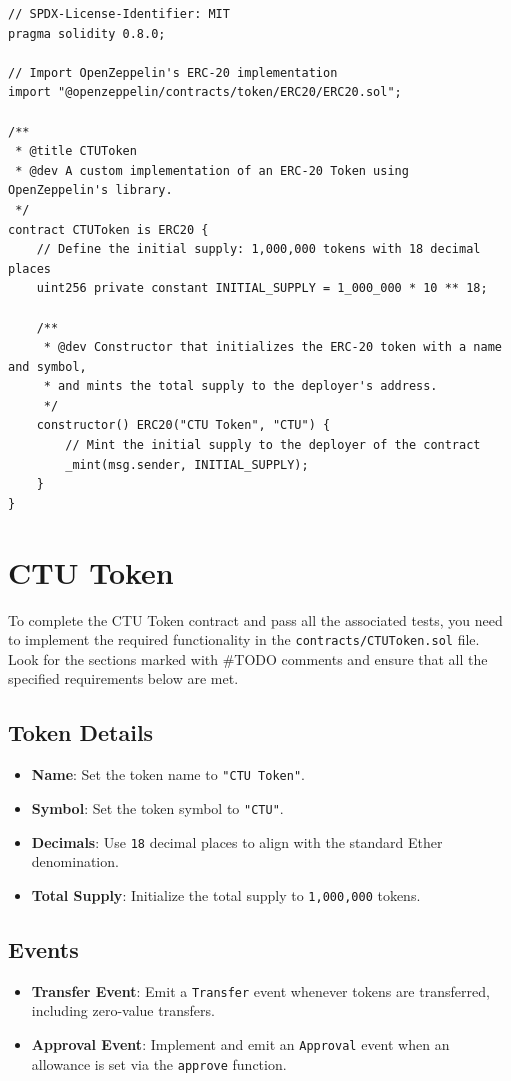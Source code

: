 \documentclass[12pt]{article}
\begin{document}
\noindent
\begin{minipage}{\textwidth}
\begin{lstlisting}[language=Solidity]
// SPDX-License-Identifier: MIT
pragma solidity 0.8.0;

// Import OpenZeppelin's ERC-20 implementation
import "@openzeppelin/contracts/token/ERC20/ERC20.sol";

/**
 * @title CTUToken
 * @dev A custom implementation of an ERC-20 Token using OpenZeppelin's library.
 */
contract CTUToken is ERC20 {
    // Define the initial supply: 1,000,000 tokens with 18 decimal places
    uint256 private constant INITIAL_SUPPLY = 1_000_000 * 10 ** 18;

    /**
     * @dev Constructor that initializes the ERC-20 token with a name and symbol,
     * and mints the total supply to the deployer's address.
     */
    constructor() ERC20("CTU Token", "CTU") {
        // Mint the initial supply to the deployer of the contract
        _mint(msg.sender, INITIAL_SUPPLY);
    }
}
\end{lstlisting}
\end{minipage}

\section{CTU Token}

To complete the CTU Token contract and pass all the associated tests, you need to implement the required functionality in the \texttt{contracts/CTUToken.sol} file. Look for the sections marked with \#TODO comments and ensure that all the specified requirements below are met.

\subsection*{Token Details}
\begin{itemize}
  \item \textbf{Name}: Set the token name to \texttt{"CTU Token"}.
  \item \textbf{Symbol}: Set the token symbol to \texttt{"CTU"}.
  \item \textbf{Decimals}: Use \texttt{18} decimal places to align with the standard Ether denomination.
  \item \textbf{Total Supply}: Initialize the total supply to \texttt{1,000,000} tokens.
\end{itemize}

\subsection*{Events}
\begin{itemize}
  \item \textbf{Transfer Event}: Emit a \texttt{Transfer} event whenever tokens are transferred, including zero-value transfers.
  \item \textbf{Approval Event}: Implement and emit an \texttt{Approval} event when an allowance is set via the \texttt{approve} function.
\end{itemize}
\end{document}
